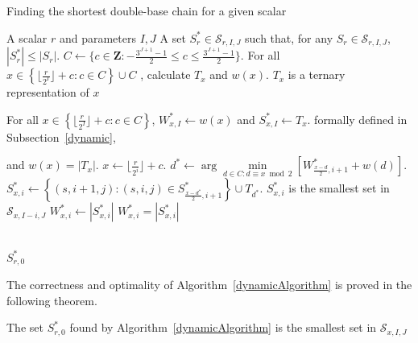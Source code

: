 \begin{algorithm}
	\caption{Finding the shortest double-base chain for a given scalar}
	\begin{algorithmic}
		\Require A scalar $r$ and parameters $I, J$
		\Ensure A set $S_r^* \in \mathcal{S}_{r,I,J}$ such that, for any $S_r \in \mathcal{S}_{r,I,J}$, $|S^*_r| \leq |S_r|$. 
		\Statex
		\State $C \leftarrow \{c \in \mathbf{Z} : -\frac{3^{J + 1} - 1}{2} \leq c \leq  \frac{3^{J + 1} - 1}{2}\}$.
		\State For all $x \in \left\{ \lfloor \frac{r}{2^I} \rfloor + c  : c \in C\right\} \cup C$ , calculate $T_x$ and $w(x)$.
		\Comment $T_x$ is a ternary representation of $x$
		 
		\State For all $x \in \left\{ \lfloor \frac{r}{2^I} \rfloor + c  : c \in C\right\}$, $W_{x,I}^* \leftarrow w(x)$ and $S_{x,I}^* \leftarrow T_x$. 
		\Comment formally defined in Subsection~\ref{dynamic},
				
		 \Comment and $w(x) = |T_x|$.
				\State $x \leftarrow \lfloor \frac{r}{2^i} \rfloor + c$.
				\State $d^* \leftarrow \arg \min\limits_{d \in C : d \equiv x \bmod 2} \left[ W^*_{\frac{x - d}{2}, i + 1 } + w(d) \right]$. 
				\State $S_{x,i}^* \leftarrow \left\{(s,i + 1,j) : (s,i,j) \in S^*_{\frac{x - d^*}{2}, i + 1 } \right\} \cup T_{d^*}$.
				\Comment $S_{x,i}^*$ is the smallest set in $\mathcal{S}_{x, I - i, J}$ 
				\State $W_{x,i}^* \leftarrow |S_{x,i}^*|$
				\Comment $W_{x,i}^* = |S_{x,i}^*|$
			\EndFor
		\EndFor
		
		\\ \Return $S_{r,0}^*$
	\end{algorithmic}
	\label{dynamicAlgorithm}
\end{algorithm}

The correctness and optimality of Algorithm~\ref{dynamicAlgorithm} is proved in the following theorem. 

\begin{theorem}
The set $S^*_{r,0}$ found by Algorithm~\ref{dynamicAlgorithm} is the smallest set in $\mathcal{S}_{x,I,J}$
\end{theorem}

